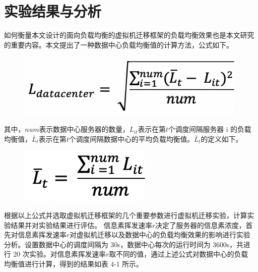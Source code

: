  \section{实验结果与分析}
如何衡量本文设计的面向负载均衡的虚拟机迁移框架的负载均衡效果也是本文研究的重要内容。本文提出了一种数据中心负载均衡值的计算方法，公式如下。

\begin{figure}[htb]
  \centering
  \includegraphics[width=0.4\linewidth]{./Figure/IMG_Chap4_4.png}
\end{figure}

其中，$ num $表示数据中心服务器的数量，$ L_{it} $表示在第$ t $个调度间隔服务器 i 的负载均衡值，$ \overline{L}_t $表示在第$ t $个调度间隔数据中心的平均负载均衡值。$ \overline{L}_t $的定义如下。

\begin{figure}[htb]
  \centering
  \includegraphics[width=0.2\linewidth]{./Figure/IMG_Chap4_5.png}
\end{figure}

根据以上公式并选取虚拟机迁移框架的几个重要参数进行虚拟机迁移实验，计算实验结果并对实验结果进行评估。
信息素挥发速率$ r $决定了服务器的信息素浓度，首先对信息素挥发速率$ r $对虚拟机迁移以及数据中心的负载均衡效果的影响进行实验分析。设置数据中心的调度间隔为 30s，数据中心每次的运行时间为 3600s，共进行 20 次实验。对信息素挥发速率$ r $取不同的值，通过上述公式对数据中心的负载均衡值进行计算，得到的结果如表 4-1 所示。

